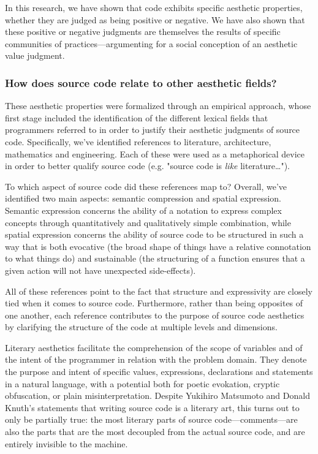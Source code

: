 In this research, we have shown that code exhibits specific aesthetic properties, whether they are judged as being positive or negative. We have also shown that these positive or negative judgments are themselves the results of specific communities of practices—argumenting for a social conception of an aesthetic value judgment.

\subsubsection{How does source code relate to other aesthetic fields?} %

These aesthetic properties were formalized through an empirical approach, whose first stage included the identification of the different lexical fields that programmers referred to in order to justify their aesthetic judgments of source code. Specifically, we've identified references to literature, architecture, mathematics and engineering. Each of these were used as a metaphorical device in order to better qualify source code (e.g. "source code is \emph{like} literature\dots").

To which aspect of source code did these references map to? Overall, we've identified two main aspects: semantic compression and spatial expression. Semantic expression concerns the ability of a notation to express complex concepts through quantitatively and qualitatively simple combination, while spatial expression concerns the ability of source code to be structured in such a way that is both evocative (the broad shape of things have a relative connotation to what things do) and sustainable (the structuring of a function ensures that a given action will not have unexpected side-effects).

All of these references point to the fact that structure and expressivity are closely tied when it comes to source code. Furthermore, rather than being opposites of one another, each reference contributes to the purpose of source code aesthetics by clarifying the structure of the code at multiple levels and dimensions.

Literary aesthetics facilitate the comprehension of the scope of variables and of the intent of the programmer in relation with the problem domain. They denote the purpose and intent of specific values, expressions, declarations and statements in a natural language, with a potential both for poetic evokation, cryptic obfuscation, or plain misinterpretation. Despite Yukihiro Matsumoto and Donald Knuth's statements that writing source code is a literary art, this turns out to only be partially true: the most literary parts of source code—comments—are also the parts that are the most decoupled from the actual source code, and are entirely invisible to the machine.

